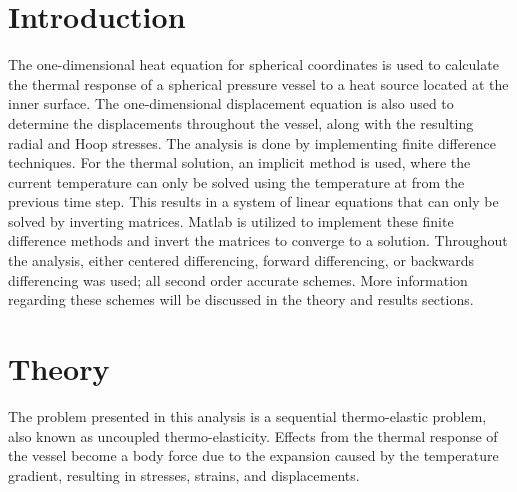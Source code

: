 \documentclass[times]{nmeauth}
\begin{document}
\section{Introduction}
\vspace{-2pt}
The one-dimensional heat equation for spherical coordinates is used to calculate the thermal response of a spherical pressure vessel to a heat source located at the inner surface. The one-dimensional displacement equation is also used to determine the displacements throughout the vessel, along with the resulting radial and Hoop stresses. The analysis is done by implementing finite difference techniques. For the thermal solution, an implicit method is used, where the current temperature can only be solved using the temperature at from the previous time step. This results in a system of linear equations that can only be solved by inverting matrices. Matlab is utilized to implement these finite difference methods and invert the matrices to converge to a solution. Throughout the analysis, either centered differencing, forward differencing, or backwards differencing was used; all second order accurate schemes. More information regarding these schemes will be discussed in the theory and results sections. 

\vspace{-6pt}

\vspace{-2pt}
\section{Theory}

The problem presented in this analysis is a sequential thermo-elastic problem, also known as uncoupled thermo-elasticity. Effects from the thermal response of the vessel become a body force due to the expansion caused by the temperature gradient, resulting in stresses, strains, and displacements. 
\end{document}
